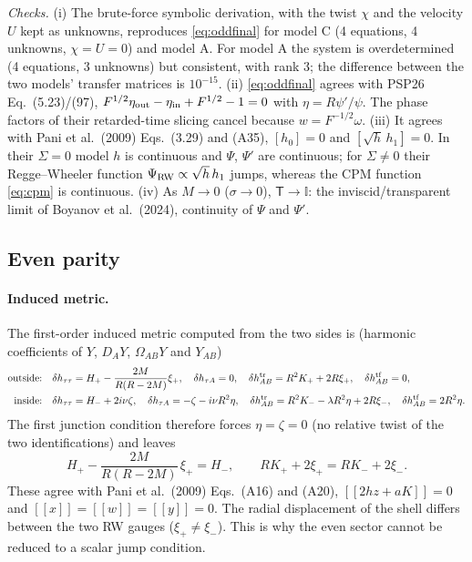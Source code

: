 \documentclass[11pt,a4paper]{article}
\numberwithin{equation}{section}
\begin{document}
\emph{Checks.} (i) The brute-force symbolic derivation, with the twist $\chi$ and the velocity $U$ kept as
unknowns, reproduces \eqref{eq:oddfinal} for model C (4 equations, 4 unknowns, $\chi=U=0$) and model A.
For model A the system is overdetermined (4 equations, 3 unknowns) but consistent, with rank 3; the
difference between the two models' transfer matrices is $10^{-15}$. (ii) \eqref{eq:oddfinal} agrees with
PSP26 Eq.~(5.23)/(97), $F^{1/2}\eta_{\rm out}-\eta_{\rm in}+F^{1/2}-1=0$ with $\eta=R\psi'/\psi$. The phase
factors of their retarded-time slicing cancel because $w=F^{-1/2}\omega$. (iii) It agrees with Pani et al.\
(2009) Eqs.~(3.29) and (A35), $[h_0]=0$ and $[\sqrt h\,h_1]=0$. In their $\Sigma=0$ model $h$ is continuous
and \(\Psi\), \(\Psi'\) are continuous; for $\Sigma\neq0$ their Regge--Wheeler function $\Psi_{\rm RW}\propto\sqrt h\,h_1$
jumps, whereas the CPM function \eqref{eq:cpm} is continuous. (iv) As $M\to0$ ($\sigma\to0$), $\mathsf T\to\mathbb{I}$:
the inviscid/transparent limit of Boyanov et al.\ (2024), continuity of $\Psi$ and $\Psi'$.



\subsection{Even parity}\label{sec:even}
\paragraph{Induced metric.} The first-order induced metric computed from the two sides is
(harmonic coefficients of $Y$, $D_AY$, $\Omega_{AB}Y$ and $Y_{AB}$)
\begin{align}
\text{outside:}&\quad \delta h_{\tau\tau}=H_+-\frac{2M}{R(R-2M)}\xi_+,\quad \delta h_{\tau A}=0,\quad
\delta h^{\rm tr}_{AB}=R^2K_++2R\xi_+,\quad \delta h^{\rm tf}_{AB}=0,\nonumber\\
\text{inside:}&\quad \delta h_{\tau\tau}=H_-+2i\nu\zeta,\quad \delta h_{\tau A}=-\zeta-i\nu R^2\eta,\quad
\delta h^{\rm tr}_{AB}=R^2K_--\lambda R^2\eta+2R\xi_-,\quad \delta h^{\rm tf}_{AB}=2R^2\eta .
\label{eq:dheven}
\end{align}
The first junction condition therefore forces $\eta=\zeta=0$ (no relative twist of the two identifications)
and leaves
\begin{equation}
H_+-\frac{2M}{R(R-2M)}\,\xi_+=H_-,\qquad RK_++2\xi_+=RK_-+2\xi_- .
\label{eq:evencont}
\end{equation}
These agree with Pani et al.\ (2009) Eqs.~(A16) and (A20), $[[2hz+aK]]=0$ and $[[x]]=[[w]]=[[y]]=0$. The radial
displacement of the shell differs between the two RW gauges ($\xi_+\neq\xi_-$). This is why the even sector
cannot be reduced to a scalar jump condition.
\end{document}
